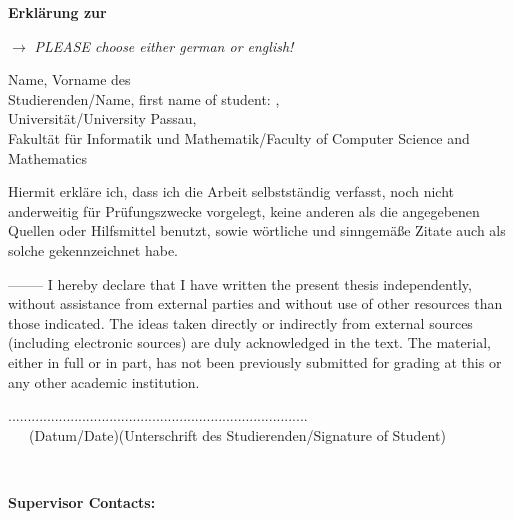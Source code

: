 
\thispagestyle{empty}

\begin{center}
\huge{\textbf{Erklärung zur \thesistype}}
\end{center}

$\rightarrow$ \textit{PLEASE choose either german or english!}

\vspace{5cm}
Name, Vorname des\\Studierenden/Name, first name of student: \hspace{4cm} \authornamelast,~\authornamefirst~\authornamemiddle
\vspace{2cm}
\\Universität/University Passau,\\
Fakultät für Informatik und Mathematik/Faculty of Computer Science and Mathematics
\vspace{3cm}
\begin{center}
Hiermit erkläre ich, dass ich die Arbeit selbstständig verfasst, noch nicht anderweitig
für Prüfungszwecke vorgelegt, keine anderen als die angegebenen Quellen oder Hilfsmittel
benutzt, sowie wörtliche und sinngemäße Zitate auch als solche gekennzeichnet habe.

--------
\newline
I hereby declare that I have written the present thesis independently, without assistance 
from external parties and without use of other resources than those indicated. The ideas 
taken directly or indirectly from external sources (including electronic sources) are duly 
acknowledged in the text. The material, either in full or in part, has not been previously 
submitted for grading at this or any other academic institution.  


\end{center}
\vspace{5.5cm}
.........................\hfill....................................................\\
~~~(Datum/Date)\hfill(Unterschrift des Studierenden/Signature of Student)

\cleardoublepage
~
\vfill


{\bf{Supervisor Contacts:}} \smallskip \\
\contactprofone\\
\contactproftwo\\
\contactsupervisor\\

\cleardoublepage